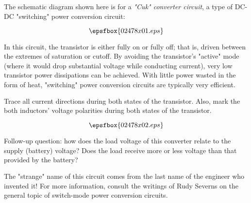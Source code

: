

The schematic diagram shown here is for a {\it "Cuk" converter circuit}, a type of DC-DC "switching" power conversion circuit:

$$\epsfbox{02478x01.eps}$$

In this circuit, the transistor is either fully on or fully off; that is, driven between the extremes of saturation or cutoff.  By avoiding the transistor's "active" mode (where it would drop substantial voltage while conducting current), very low transistor power dissipations can be achieved.  With little power wasted in the form of heat, "switching" power conversion circuits are typically very efficient.

Trace all current directions during both states of the transistor.  Also, mark the both inductors' voltage polarities during both states of the transistor.







$$\epsfbox{02478x02.eps}$$

\vskip 10pt

Follow-up question: how does the load voltage of this converter relate to the supply (battery) voltage?  Does the load receive more or less voltage than that provided by the battery?







The "strange" name of this circuit comes from the last name of the engineer who invented it!  For more information, consult the writings of Rudy Severns on the general topic of switch-mode power conversion circuits.




